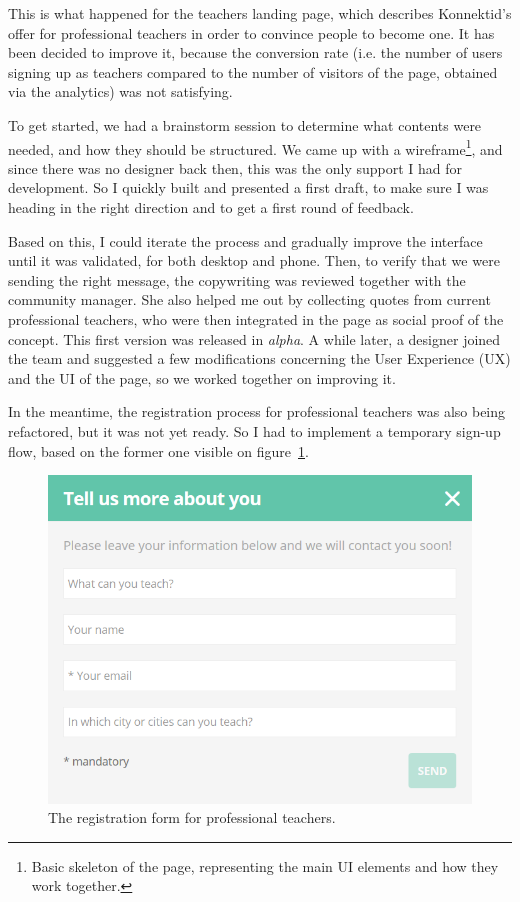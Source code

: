This is what happened for the teachers landing page, which describes Konnektid's offer for professional teachers in order to convince people to become one. It has been decided to improve it, because the conversion rate (i.e. the number of users signing up as teachers compared to the number of visitors of the page, obtained via the analytics) was not satisfying.

To get started, we had a brainstorm session to determine what contents were needed, and how they should be structured. We came up with a wireframe\footnote{Basic skeleton of the page, representing the main UI elements and how they work together.}, and since there was no designer back then, this was the only support I had for development. So I quickly built and presented a first draft, to make sure I was heading in the right direction and to get a first round of feedback.

Based on this, I could iterate the process and gradually improve the interface until it was validated, for both desktop and phone. Then, to verify that we were sending the right message, the copywriting was reviewed together with the community manager. She also helped me out by collecting quotes from current professional teachers, who were then integrated in the page as social proof of the concept. This first version was released in \textit{alpha}. A while later, a designer joined the team and suggested a few modifications concerning the User Experience (UX) and the UI of the page, so we worked together on improving it.

In the meantime, the registration process for professional teachers was also being refactored, but it was not yet ready. So I had to implement a temporary sign-up flow, based on the former one visible on {\sc figure}~\ref{fig:signUpFlow}.

 \begin{figure}[H]
    \centering
    \includegraphics[scale=0.6]{figure/signUpFlow.png}
    \caption{The registration form for professional teachers.}
    \label{fig:signUpFlow}
\end{figure}


